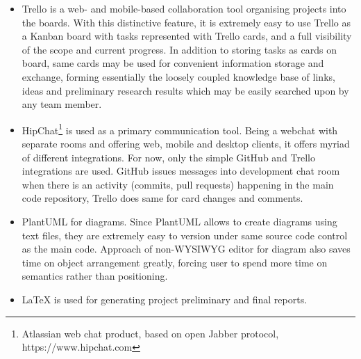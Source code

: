 \begin{itemize}
	\item Trello is a web- and mobile-based collaboration tool organising projects into the boards. With this distinctive feature, it is extremely easy to use Trello as a
	Kanban board with tasks represented with Trello cards, and a full visibility of the scope and current progress. In addition to storing tasks as cards on board, same cards
	may be used for convenient information storage and exchange, forming essentially the loosely coupled knowledge base of links, ideas and preliminary research
	results which may be easily searched upon by any team member.
	\item HipChat\footnote{Atlassian web chat product, based on open Jabber protocol, https://www.hipchat.com} is used as a primary communication tool. Being a webchat with separate rooms and offering web, mobile and desktop clients, it offers myriad of different integrations. For now, only the simple GitHub and Trello integrations are used. GitHub issues messages into development chat room when there is an activity (commits, pull requests) happening in the main code repository, Trello does same for card changes and comments.
	\item PlantUML for diagrams. Since PlantUML allows to create diagrams using text files, they are extremely easy to version under same source code control as the main code. Approach of non-WYSIWYG editor for diagram also saves time on object arrangement greatly, forcing user to spend more time on semantics rather than positioning.
	\item LaTeX is used for generating project preliminary and final reports.
\end{itemize}
